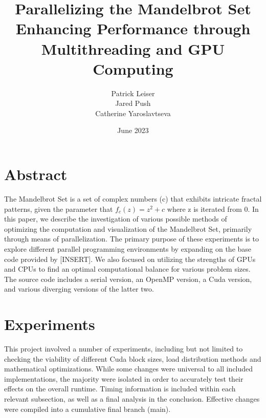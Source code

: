 \documentclass{article}
\begin{document}
\title{\textbf{Parallelizing the Mandelbrot Set \\ \large Enhancing Performance through Multithreading and GPU Computing}}
\author{\begin{tabular}{cc}Patrick Leiser\\
Jared Push\\Catherine Yaroslavtseva\\\end{tabular}}

\date{June 2023}

\maketitle

\section{Abstract}

The Mandelbrot Set is a set of complex numbers (c) that exhibits intricate fractal patterns, given the parameter that $f_c(z) = z^2 + c$ where z is iterated from 0.
In this paper, we describe the investigation of various possible methods of optimizing the computation and visualization of the Mandelbrot Set, primarily through means of parallelization.
The primary purpose of these experiments is to explore different parallel programming environments by expanding on the base code provided by [INSERT].
We also focused on utilizing the strengths of GPUs and CPUs to find an optimal computational balance for various problem sizes.\\ 

The source code includes a serial version, an OpenMP version, a Cuda version, and various diverging versions of the latter two.

\section{Experiments}

This project involved a number of experiments, including but not limited to checking the viability of different Cuda block sizes, load distribution methods and mathematical optimizations.
While some changes were universal to all included implementations, the majority were isolated in order to accurately test their effects on the overall runtime.
Timing information is included within each relevant subsection, as well as a final analysis in the conclusion.
Effective changes were compiled into a cumulative final branch (main).
\end{document}
